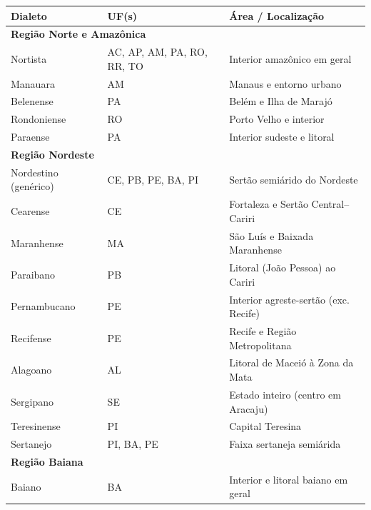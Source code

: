 \begin{table}[ht]
\centering
\tiny
\setlength{\tabcolsep}{6pt}
\begin{tabular}{lll}
\hline
\textbf{Dialeto} & \textbf{UF(s)} & \textbf{Área / Localização} \\
\hline
\multicolumn{3}{l}{

\textbf{Região Norte e Amazônica}} \\ \hline
Nortista    & AC, AP, AM, PA, RO, RR, TO & Interior amazônico em geral \\
Manauara    & AM                         & Manaus e entorno urbano     \\
Belenense   & PA                         & Belém e Ilha de Marajó      \\
Rondoniense & RO                         & Porto Velho e interior      \\
Paraense    & PA                         & Interior sudeste e litoral  \\
\hline
\multicolumn{3}{l}{\textbf{Região Nordeste}} \\ \hline
Nordestino (genérico) & CE, PB, PE, BA, PI & Sertão semiárido do Nordeste       \\
Cearense              & CE                  & Fortaleza e Sertão Central–Cariri  \\
Maranhense            & MA                  & São Luís e Baixada Maranhense     \\
Paraibano             & PB                  & Litoral (João Pessoa) ao Cariri    \\
Pernambucano          & PE                  & Interior agreste-sertão (exc. Recife) \\
Recifense             & PE                  & Recife e Região Metropolitana      \\
Alagoano              & AL                  & Litoral de Maceió à Zona da Mata   \\
Sergipano             & SE                  & Estado inteiro (centro em Aracaju) \\
Teresinense           & PI                  & Capital Teresina                   \\
Sertanejo             & PI, BA, PE          & Faixa sertaneja semiárida          \\
\hline
\multicolumn{3}{l}{\textbf{Região Baiana}} \\ \hline
Baiano          & BA & Interior e litoral baiano em geral      \\

\end{tabular}
\end{table}
